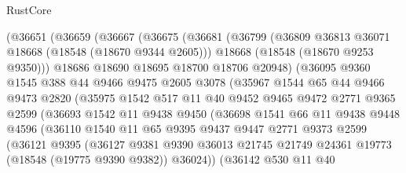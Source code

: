 \begin{lexlean}{RustCore}
\begin{coremodule}
          (@36651
            (@36659
              (@36667
                (@36675
                  (@36681
                    (@36799
                      (@36809 @36813 @36071 @18668 (@18548 (@18670 @9344 @2605)))
                      @18668
                      (@18548 (@18670 @9253 @9350)))
                    @18686
                    @18690
                    @18695
                    @18700
                    @18706
                    @20948)
                  (@36095
                    @9360
                    @1545
                    @388
                    @44
                    @9466
                    @9475
                    @2605
                    @3078
                    (@35967
                      @1544
                      @65
                      @44
                      @9466
                      @9473
                      @2820
                      (@35975
                        @1542
                        @517
                        @11
                        @40
                        @9452
                        @9465
                        @9472
                        @2771
                        @9365
                        @2599
                        (@36693
                          @1542
                          @11
                          @9438
                          @9450
                          (@36698
                            @1541
                            @66
                            @11
                            @9438
                            @9448
                            @4596
                            (@36110
                              @1540
                              @11
                              @65
                              @9395
                              @9437
                              @9447
                              @2771
                              @9373
                              @2599
                              (@36121
                                @9395
                                (@36127
                                  @9381
                                  @9390
                                  @36013
                                  @21745
                                  @21749
                                  @24361
                                  @19773
                                  (@18548 (@19775 @9390 @9382))
                                  @36024))
                              (@36142
                                @530
                                @11
                                @40

\end{coremodule}
\end{lexlean}

